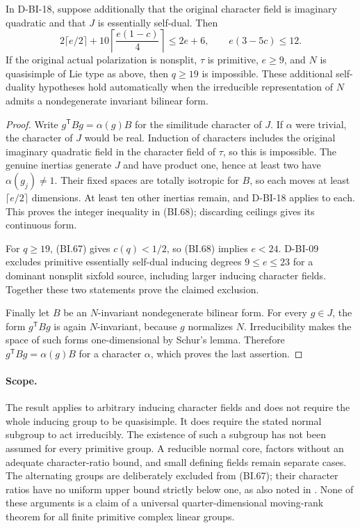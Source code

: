 \begin{corollary}
\label{D-BI-18a}
In D-BI-18, suppose additionally that the original character field
is imaginary quadratic and that $J$ is essentially self-dual.
Then
\[
 2\lceil e/2\rceil+
 10\left\lceil\frac{e(1-c)}4\right\rceil\le2e+6,
 \qquad e(3-5c)\le12.                                      \tag{BI.68}
\]
If the original actual polarization is nonsplit, $\tau$ is primitive,
$e\ge9$, and $N$ is quasisimple of Lie type as above, then
$q\ge19$ is impossible.  These additional self-duality hypotheses
hold automatically when the irreducible representation of $N$
admits a nondegenerate invariant bilinear form.
\end{corollary}
\begin{proof}
Write $g^{\mathsf T}Bg=\alpha(g)B$ for the similitude character of
$J$.  If $\alpha$ were trivial, the character of $J$ would be real.
Induction of characters includes the original imaginary quadratic
field in the character field of $\tau$, so this is impossible.
The genuine inertias generate $J$ and have product one, hence at
least two have $\alpha(g_j)\ne1$.  Their fixed spaces are totally
isotropic for $B$, so each moves at least $\lceil e/2\rceil$
dimensions.  At least ten other inertias remain, and D-BI-18
applies to each.  This proves the integer inequality in (BI.68);
discarding ceilings gives its continuous form.

For $q\ge19$, (BI.67) gives $c(q)<1/2$, so (BI.68) implies
$e<24$.  D-BI-09 excludes primitive essentially self-dual inducing
degrees $9\le e\le23$ for a dominant nonsplit sixfold source,
including larger inducing character fields.  Together these two
statements prove the claimed exclusion.

Finally let $B$ be an $N$-invariant nondegenerate bilinear form.
For every $g\in J$, the form $g^{\mathsf T}Bg$ is again
$N$-invariant, because $g$ normalizes $N$.  Irreducibility makes
the space of such forms one-dimensional by Schur's lemma.
Therefore $g^{\mathsf T}Bg=\alpha(g)B$ for a character $\alpha$,
which proves the last assertion.
\end{proof}

\paragraph{Scope.}
The result applies to arbitrary inducing character fields and does
not require the whole inducing group to be quasisimple.  It does
require the stated normal subgroup to act irreducibly.  The
existence of such a subgroup has not been assumed for every
primitive group.  A reducible normal core, factors without an
adequate character-ratio bound, and small defining fields remain
separate cases.  The alternating groups are deliberately excluded
from (BI.67); their character ratios have no uniform upper bound
strictly below one, as also noted in
\cite[Remark~4.2, p.~141]{BI:DHP}.  None of these arguments is a
claim of a universal quarter-dimensional moving-rank theorem for
all finite primitive complex linear groups.
